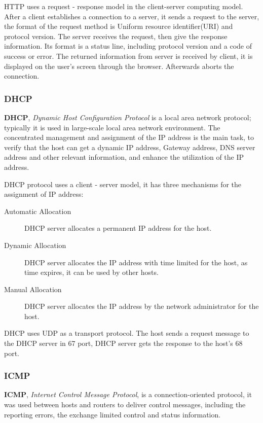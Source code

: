 HTTP uses a request - response model in the client-server computing model. After a client establishes a connection to a server, it sends a request to the server, the format of the request method is Uniform resource identifier(URI) and protocol version. The server receives the request, then give the response information. Its format is a status line, including protocol version and a code of success or error. The returned information from server is received by client, it is displayed on the user's screen through the browser. Afterwards aborts the connection.

\subsubsection{DHCP}
\textbf{DHCP}, \textit{Dynamic Host Configuration Protocol} is a local area network protocol; typically it is used in large-scale local area network environment. The concentrated management and assignment of the IP address is the main task, to verify that the host can get a dynamic IP address, Gateway address, DNS server address and other relevant information, and enhance the utilization of the IP address.  

DHCP protocol uses a client - server model, it has three mechanisms for the assignment of IP address:

\begin{description}
	\item[Automatic Allocation] DHCP server allocates a permanent IP address for the host.
	\item[Dynamic Allocation] DHCP server allocates the IP address with time limited for the host, as time expires, it can be used by other hosts.
	\item[Manual Allocation] DHCP server allocates the IP address by the network administrator for the host.
\end{description}

DHCP uses UDP as a transport protocol. The host sends a request message to the DHCP server in 67 port, DHCP server gets the response to the host's 68 port.

\subsubsection{ICMP}

\textbf{ICMP}, \textit{Internet Control Message Protocol}, is a connection-oriented protocol, it was used between hosts and routers to deliver control messages, including the reporting errors, the exchange limited control and status information.  

